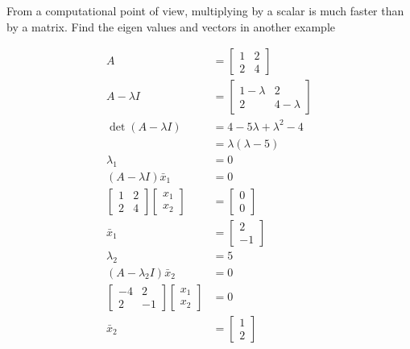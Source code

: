 \documentclass[main.tex]{subfiles}
\begin{document}
    From a computational point of view, multiplying by a scalar is much faster than by a matrix. Find the eigen values and vectors in another example
    
    $$
    \begin{aligned}
    A &= \left[\begin{array}{ll}
    1 & 2 \\
    2 & 4
    \end{array}\right]\\
    A-\lambda I &= \left[\begin{array}{ccc}
    1 -\lambda & 2 \\
    2 & 4-\lambda
    \end{array}\right]\\
    \operatorname{det}(A-\lambda I) &= 4-5 \lambda+\lambda^{2}-4 \\
    &=\lambda(\lambda-5)\\
    \lambda_{1}&=0\\
    (A- \lambda I) \bar{x}_{1} &=0 \\
    \left[\begin{array}{ll}
    1 & 2 \\
    2 & 4
    \end{array}\right] \left[\begin{array}{l}
    x_{1} \\
    x_{2}
    \end{array}\right] & =\left[\begin{array}{l}
    0 \\
    0
    \end{array}\right] \\
    \bar{x}_{1} &= \left[\begin{array}{l}
    2 \\
    -1
    \end{array}\right]\\
    \lambda_2 &= 5 \\
    (A-\lambda_2 I) \bar{x}_2&=0 \\
    \left[\begin{array}{rr}
    -4 & 2 \\
    2 & -1
    \end{array}\right]\left[\begin{array}{l}
    x_{1} \\
    x_{2}
    \end{array}\right]&=0 \\
    \bar{x}_{2} &= \left[\begin{array}{l}
    1 \\
    2
    \end{array}\right]
    \end{aligned}
    $$
    
\end{document}
